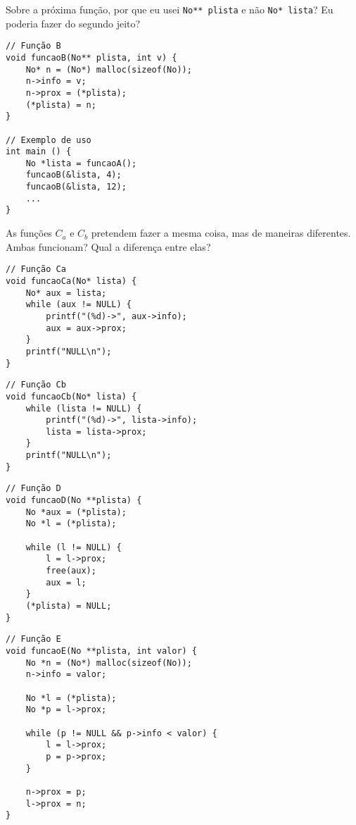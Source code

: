 \documentclass[a4paper]{article}
\begin{document}
Sobre a próxima função, por que eu usei \verb|No** plista| e não \verb|No* lista|?
Eu poderia fazer do segundo jeito?
\begin{tcolorbox}
    \begin{verbatim}
// Função B
void funcaoB(No** plista, int v) {    
    No* n = (No*) malloc(sizeof(No));
    n->info = v;
    n->prox = (*plista);
    (*plista) = n;
}

// Exemplo de uso
int main () {
    No *lista = funcaoA();
    funcaoB(&lista, 4);
    funcaoB(&lista, 12);
    ...
}
    \end{verbatim}
\end{tcolorbox}

As funções $C_a$ e $C_b$ pretendem fazer a mesma coisa, mas de maneiras
diferentes. Ambas funcionam? Qual a diferença entre elas? 
\begin{tcolorbox}
    \begin{verbatim}
// Função Ca
void funcaoCa(No* lista) {
    No* aux = lista;
    while (aux != NULL) {
        printf("(%d)->", aux->info);
        aux = aux->prox;
    }
    printf("NULL\n");
}
    \end{verbatim}
\end{tcolorbox}


\begin{tcolorbox}
    \begin{verbatim}
// Função Cb
void funcaoCb(No* lista) {
    while (lista != NULL) {
        printf("(%d)->", lista->info);
        lista = lista->prox;
    }
    printf("NULL\n");
}
    \end{verbatim}
\end{tcolorbox}


\begin{tcolorbox}
    \begin{verbatim}
// Função D
void funcaoD(No **plista) {
    No *aux = (*plista);
    No *l = (*plista);

    while (l != NULL) {
        l = l->prox;
        free(aux);
        aux = l;
    }
    (*plista) = NULL;
}
    \end{verbatim}
\end{tcolorbox}

\begin{tcolorbox}
    \begin{verbatim}
// Função E
void funcaoE(No **plista, int valor) {
    No *n = (No*) malloc(sizeof(No));
    n->info = valor;
    
    No *l = (*plista);
    No *p = l->prox;

    while (p != NULL && p->info < valor) {
        l = l->prox;
        p = p->prox;
    }

    n->prox = p;
    l->prox = n;
}
    \end{verbatim}
\end{tcolorbox}
\end{document}
